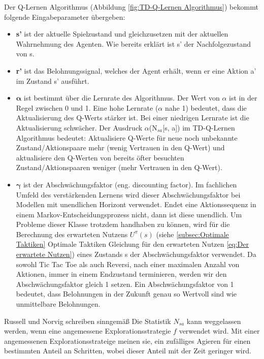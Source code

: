 Der Q-Lernen Algorithmus (Abbildung \ref{fig:TD-Q-Lernen Algorithmus}) bekommt folgende Eingabeparameter übergeben:

\begin{itemize}
\item \textbf{s'} ist der aktuelle Spielzustand und gleichzusetzen mit der aktuellen Wahrnehmung des Agenten. Wie bereits erklärt ist s' der Nachfolgezustand von s.

\item \textbf{r'} ist das Belohnungssignal, welches der Agent erhält, wenn er eine Aktion a' im Zustand s' ausführt. 

\item $\boldsymbol{\alpha}$ ist bestimmt über die Lernrate des Algorithmus. Der Wert von $\alpha$ ist in der Regel zwischen 0 und 1. Eine hohe Lernrate ($\alpha$ nahe 1) bedeutet, dass die Aktualisierung des Q-Werts stärker ist. Bei einer niedrigen Lernrate ist die Aktualisierung schwächer. Der Ausdruck $\alpha$(N$_{sa}$[s, a]) im TD-Q-Lernen Algorithmus bedeutet: Aktualisiere Q-Werte für neue noch unbekannte Zustand/Aktionspaare mehr (wenig Vertrauen in den Q-Wert) und aktualisiere den Q-Werten von bereits öfter besuchten Zustand/Aktionspaaren weniger (mehr Vertrauen in den Q-Wert). 

\item $\boldsymbol{\gamma}$ ist der Abschwächungsfaktor (eng. discounting factor). Im fachlichen Umfeld des verstärkenden Lernens wird dieser Abschwächungsfaktor bei Modellen mit unendlichen Horizont verwendet. Endet eine Aktionssequenz in einem Markov-Entscheidungsprozess nicht, dann ist diese unendlich. Um Probleme dieser Klasse trotzdem handhaben zu können, wird für die Berechnung des erwarteten Nutzens $U^\pi(s)$ (siehe \ref{subsec:Optimale Taktiken} Optimale Taktiken Gleichung für den erwarteten Nutzen \ref{eq:Der erwartete Nutzen}) eines Zustands s der Abschwächungsfaktor verwendet. Da sowohl Tic Tac Toe als auch Reversi, nach einer maximalen Anzahl von Aktionen, immer in einem Endzustand terminieren, werden wir den Abschwächungsfaktor gleich 1 setzen. Ein Abschwächungsfaktor von 1 bedeutet, dass Belohnungen in der Zukunft genau so Wertvoll sind wie unmittelbare Belohnungen. 
\end{itemize} 

Russell und Norvig schreiben sinngemäß \cite[974]{Russell} Die Statistik $N_{sa}$ kann weggelassen werden, wenn eine angemessene Explorationsstrategie $f$ verwendet wird. Mit einer angemessenen Explorationsstrateige meinen sie, ein zufälliges Agieren für einen bestimmten Anteil an Schritten, wobei dieser Anteil mit der Zeit geringer wird. \\

